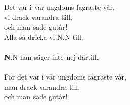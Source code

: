 \vspace{10pt}
Det var i vår ungdoms fagraste vår,\\
vi drack varandra till,\\
och man sade gutår!\\
Alla så dricka vi N.N till.\\
\\
{\textbf N.N han säger inte nej därtill.}\\
\\
För det var i vår ungdoms fagraste vår,\\
man drack varandra till,\\
och man sade gutår! 
